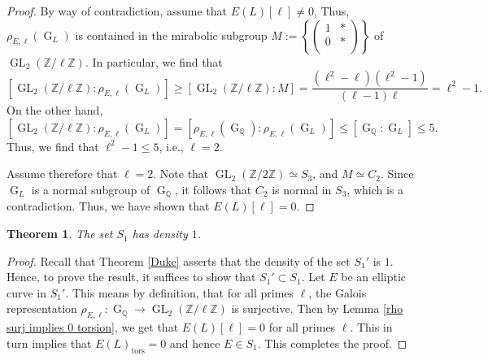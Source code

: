 \documentclass[12pt]{amsart}
\newtheorem{theorem}{Theorem}[section]
\newcommand{\Z}{\mathbb{Z}}
\newcommand{\Q}{\mathbb{Q}}
\newcommand{\op}[1]{\operatorname{#1}}
\newcommand\mtx[4] { \left( {\begin{array}{cc}
 #1 & #2 \\
 #3 & #4 \\
 \end{array} } \right)}
\numberwithin{equation}{section}
\begin{document}
\begin{proof}
   \par By way of contradiction, assume that $E(L)[\ell] \neq 0$. Thus, $\rho_{E,\ell}(\op{G}_L)$ is contained in the mirabolic subgroup $M:= \left\{\mtx{1}{\ast}{0}{\ast}\right\}$ of $\op{GL}_2(\Z/\ell\Z)$. In particular, we find that
   \[[\op{GL}_2(\Z/\ell\Z):\rho_{E,\ell}(\op{G}_L)]\geq [\op{GL}_2(\Z/\ell\Z):M]=\frac{(\ell^2-\ell)(\ell^2-1)}{(\ell-1)\ell}=\ell^2-1.\]
   On the other hand, 
   \[[\op{GL}_2(\Z/\ell\Z):\rho_{E,\ell}(\op{G}_L)]= [\rho_{E,\ell}(\op{G}_\Q): \rho_{E,\ell}(\op{G}_L)]\leq [\op{G}_{\Q}: \op{G}_L]\leq 5.\]
   Thus, we find that $\ell^2-1\leq 5$, i.e., $\ell=2$. 
   
\par Assume therefore that $\ell=2$. Note that $\op{GL}_2(\Z/2\Z)\simeq S_3$, and $M\simeq C_2$. Since $\op{G}_L$ is a normal subgroup of $\op{G}_{\Q}$, it follows that $C_2$ is normal in $S_3$, which is a contradiction. Thus, we have shown that $E(L)[\ell]=0$. 
\end{proof}

\begin{theorem}\label{S_1 has density 1}
    The set $S_1$ has density $1$.
\end{theorem}
\begin{proof}
    Recall that Theorem \ref{Duke} asserts that the density of the set $S_1'$ is $1$. Hence, to prove the result, it suffices to show that $S_1' \subset S_1$. Let $E$ be an elliptic curve in $S_1'$. This means by definition, that for all primes $\ell$, the Galois representation $\rho_{E,\ell}:\op{G}_{\Q} \to \op{GL}_2(\Z/\ell\Z)$ is  surjective. Then by Lemma \ref{rho surj implies 0 torsion}, we get that $E(L)[\ell]=0$ for all primes $\ell$. This in turn implies that $E(L)_{\op{tors}}=0$ and hence $E \in S_1$. This completes the proof.
\end{proof}
\end{document}
